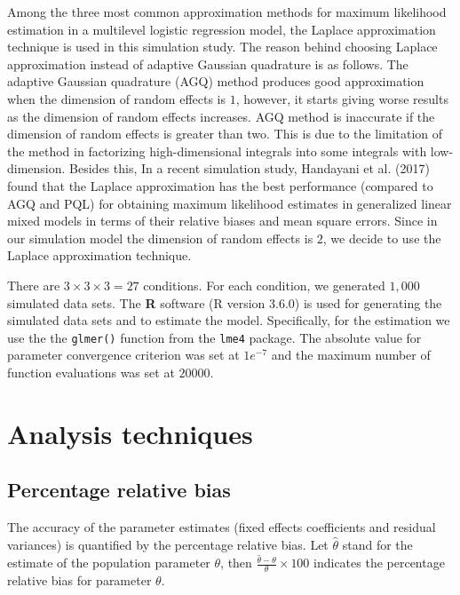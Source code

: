 \documentclass[12pt,oneside,a4paper]{reedthesis}
\begin{document}
Among the three most common approximation methods for maximum likelihood estimation in a multilevel logistic regression model, the Laplace approximation technique is used in this simulation study. The reason behind choosing Laplace approximation instead of adaptive Gaussian quadrature is as follows. The adaptive Gaussian quadrature (AGQ) method produces good approximation when the dimension of random effects is \(1\), however, it starts giving worse results as the dimension of random effects increases. AGQ method is inaccurate if the dimension of random effects is greater than two. This is due to the limitation of the method in factorizing high-dimensional integrals into some integrals with low-dimension. Besides this, In a recent simulation study, Handayani et al. (2017) found that the Laplace approximation has the best performance (compared to AGQ and PQL) for obtaining maximum likelihood estimates in generalized linear mixed models in terms of their relative biases and mean square errors. Since in our simulation model the dimension of random effects is \(2\), we decide to use the Laplace approximation technique.

There are \(3\times3\times3=27\) conditions. For each condition, we generated \(1,000\) simulated data sets. The \textbf{R} software (R version 3.6.0) is used for generating the simulated data sets and to estimate the model. Specifically, for the estimation we use the the \texttt{glmer()} function from the \texttt{lme4} package. The absolute value for parameter convergence criterion was set at \(1e^{-7}\) and the maximum number of function evaluations was set at \(20000\).

\hypertarget{analysis-techniques}{%
\section{Analysis techniques}\label{analysis-techniques}}

\hypertarget{percentage-relative-bias}{%
\subsection{Percentage relative bias}\label{percentage-relative-bias}}

The accuracy of the parameter estimates (fixed effects coefficients and residual variances) is quantified by the percentage relative bias. Let \(\hat{\theta}\) stand for the estimate of the population parameter \(\theta\), then \(\frac{\hat{\theta}-\theta}{\theta} \times 100\) indicates the percentage relative bias for parameter \(\theta\).
\end{document}
